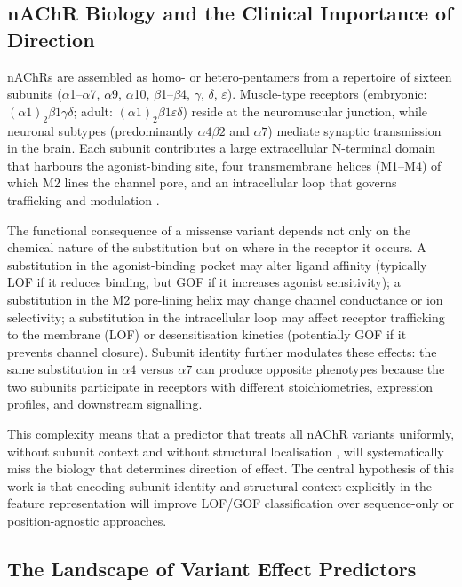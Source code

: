 \documentclass{ws-procs11x85}
\begin{document}
\subsection{nAChR Biology and the Clinical Importance of Direction}

nAChRs are assembled as homo- or hetero-pentamers from a repertoire of
sixteen subunits ($\alpha$1–$\alpha$7, $\alpha$9, $\alpha$10,
$\beta$1–$\beta$4, $\gamma$, $\delta$, $\varepsilon$). Muscle-type receptors (embryonic:
$(\alpha1)_2\beta1\gamma\delta$; adult: $(\alpha1)_2\beta1\varepsilon\delta$)
reside at the neuromuscular junction, while neuronal subtypes
(predominantly $\alpha4\beta2$ and $\alpha7$) mediate synaptic
transmission in the brain. Each subunit contributes a large extracellular
N-terminal domain that harbours the agonist-binding site, four
transmembrane helices (M1–M4) of which M2 lines the channel pore, and
an intracellular loop that governs trafficking and modulation
\cite{nachr_structure_2021}.

The functional consequence of a missense variant depends not only on
the chemical nature of the substitution but on where in the receptor
it occurs. A substitution in the agonist-binding pocket may alter ligand
affinity (typically LOF if it reduces binding, but GOF if it increases
agonist sensitivity); a substitution in the M2 pore-lining helix may
change channel conductance or ion selectivity; a substitution in the
intracellular loop may affect receptor trafficking to the membrane
(LOF) or desensitisation kinetics (potentially GOF if it prevents
channel closure). Subunit identity further modulates these effects:
the same substitution in $\alpha4$ versus $\alpha7$ can produce opposite
phenotypes because the two subunits participate in receptors with
different stoichiometries, expression profiles, and downstream signalling.

This complexity means that a predictor that treats all nAChR variants
uniformly, without subunit context and without structural localisation
, will systematically miss the biology that determines direction of
effect. The central hypothesis of this work is that encoding subunit
identity and structural context explicitly in the feature representation
will improve LOF/GOF classification over sequence-only or
position-agnostic approaches.

\subsection{The Landscape of Variant Effect Predictors}
\end{document}
